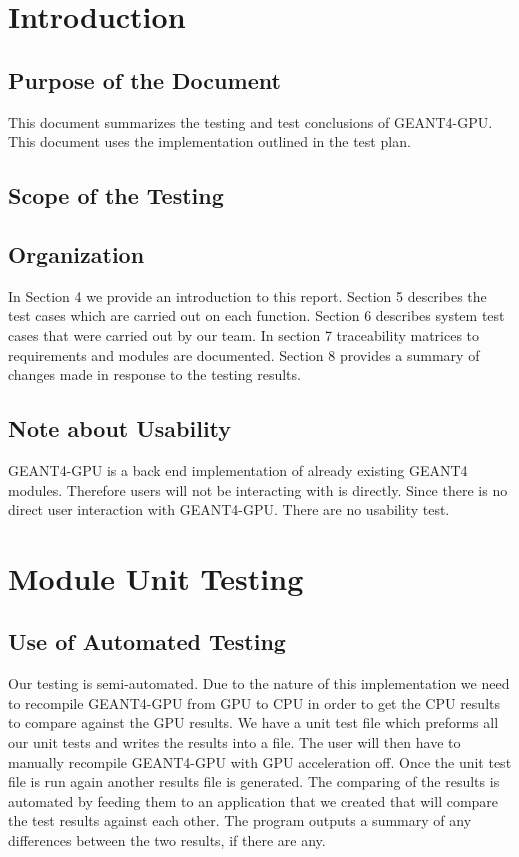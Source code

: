 \documentclass[12pt]{article}
\begin{document}
\section{Introduction}
\subsection{Purpose of the Document}
This document summarizes the testing and test conclusions of GEANT4-GPU. This document uses the implementation outlined in the test plan.
\subsection{Scope of the Testing}
\subsection{Organization}
In Section 4 we provide an introduction to this report. Section 5 describes the test cases which are carried out on each function. Section 6 describes system test cases that were carried out by our team. In section 7 traceability matrices to requirements and modules are documented. Section 8 provides a summary of changes made in response to the testing results.
\subsection{Note about Usability}
GEANT4-GPU is a back end implementation of already existing GEANT4 modules. Therefore users will not be interacting with is directly. Since there is no direct user interaction with GEANT4-GPU. There are no usability test. 

\section{Module Unit Testing}
\subsection{Use of Automated Testing}
Our testing is semi-automated. Due to the nature of this implementation we need to recompile GEANT4-GPU from GPU to CPU in order to get the CPU results to compare against the GPU results. We have a unit test file which preforms all our unit tests and writes the results into a file. The user will then have to manually recompile GEANT4-GPU with GPU acceleration off. Once the unit test file is run again another results file is generated. The comparing of the results is automated by feeding them to an application that we created that will compare the test results against each other. The program outputs a summary of any differences between the two results, if there are any.
\end{document}
